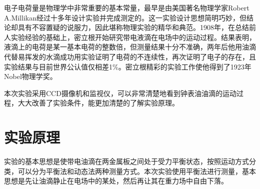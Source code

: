 \documentclass{WHUReport}
\begin{document}
\begin{multicols}{2}
	电子电荷量是物理学中非常重要的基本常量，最早是由美国著名物理学家Robert A.Millikan经过十多年设计实验并完成测定的。这一实验设计思想简明巧妙，但结论却具有不容置疑的说服力，因此堪称物理实验的精华和典范。1908年，在总结前人实验经验的基础上，密立根开始研究带电液滴在电场中的运动过程。结果表明，液滴上的电荷是某一基本电荷的整数倍，但测量结果十分不准确，两年后他用油滴代替易挥发的水滴成功用实验证明了电荷的不连续性，再次证明了电子的存在，且实验结果与目前世界公认值仅相差1\%。密立根精彩的实验工作使他得到了1923年Nobel物理学奖。
	
	本次实验采用CCD摄像机和监视仪，可以非常清楚地看到钟表油油滴的运动过程，大大改善了实验条件，能更加清楚的了解实验原理。
	\section{实验原理}
	实验的基本思想是使带电油滴在两金属板之间处于受力平衡状态，按照运动方式分类，可以分为平衡法和动态法两种测量方式。本次实验使用平衡法进行测量，基本思想是先让油滴静止在电场中的某处，然后再让其在重力场中自由下落。

\end{multicols}
\end{document}
